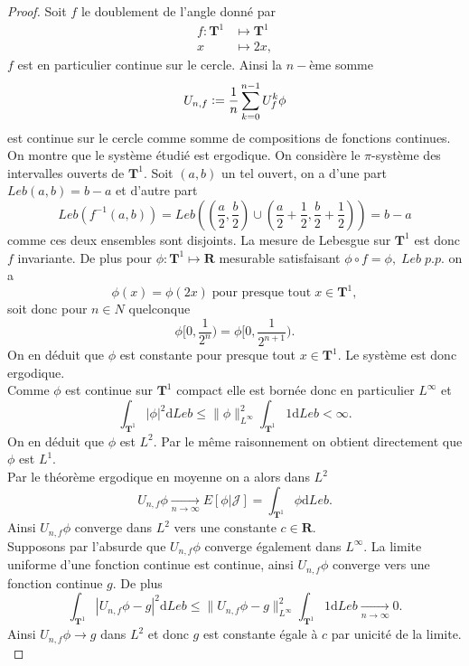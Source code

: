 \documentclass[12pt]{article}
\newcommand{\defeq}{\vcentcolon=}
\newcommand{\R}{\mathbf{R}}
\newcommand{\de}{\mathrm{d}}
\begin{document}
\begin{proof}
        Soit $f$ le doublement de l'angle donné par 
         \begin{align*}
                 f : \mathbf{T}^{1} &\longmapsto \mathbf{T}^{1} \\
                 x &\longmapsto 2x
        ,\end{align*} $f$ est en particulier continue sur le cercle. Ainsi la $n-$ème somme \[
        U_{n, f} \defeq \frac{1}{n}\sum_{k=0}^{n-1} U_{f}^{k}\phi 
        \] est continue sur le cercle comme somme de compositions de fonctions continues. \\  

        On montre que le système étudié est ergodique. On considère le $\pi$-système des intervalles ouverts de $\mathbf{T}^{1}$. Soit $(a, b)$ un tel ouvert, on a d'une part $Leb(a,b) = b-a$ et d'autre part \[
                Leb(f^{-1}(a,b)) = Leb((\frac{a}{2}, \frac{b}{2})\cup (\frac{a}{2}+\frac{1}{2}, \frac{b}{2}+\frac{1}{2})) = b-a
        \] comme ces deux ensembles sont disjoints. La mesure de Lebesgue sur $\mathbf{T}^{1}$ est donc $f$ invariante. De plus pour $\phi : \mathbf{T}^{1} \longmapsto \R$ mesurable satisfaisant $\phi\circ f = \phi, \; Leb \; p.p.$ on a \[
        \phi(x) = \phi(2x)\; \text{pour presque tout} \; x \in \mathbf{T}^{1},
\] soit donc pour $n \in N$ quelconque \[
\phi[0, \frac{1}{2^{n}}) = \phi[0, \frac{1}{2^{n+1}})
.\] On en déduit que $\phi$ est constante pour presque tout $x \in \mathbf{T}^{1}$. Le système est donc ergodique. \\

Comme $\phi$ est continue sur $\mathbf{T}^{1}$ compact elle est bornée donc en particulier $L^{\infty}$ et  \[
\int_{\mathbf{T}^{1}}|\phi|^{2}\de Leb \le \|\phi\|_{L^{\infty}}^{2}\int_{\mathbf{T}^{1}}1\de Leb < \infty
.\] On en déduit que $\phi$ est $L^{2}$. Par le même raisonnement on obtient directement que $\phi$ est $L^{1}$. \\

Par le théorème ergodique en moyenne on a alors dans $L^{2}$ \[
        U_{n,f}\phi \underset{n\to \infty}{\to} E[\phi|\mathcal{J}] = \int_{\mathbf{T}^{1}}\phi \de Leb
.\] Ainsi $U_{n,f}\phi$ converge dans $L^{2}$ vers une constante $c \in \R$. \\ 

Supposons par l'absurde que $U_{n,f}\phi$ converge également dans $L^{\infty}$. La limite uniforme d'une fonction continue est continue, ainsi $U_{n,f}\phi$ converge vers une fonction continue $g$. De plus  \[
\int_{\mathbf{T}^{1}}|U_{n,f}\phi - g|^{2} \de Leb \le \|U_{n,f}\phi - g\|_{L^{\infty}}^{2}\int_{\mathbf{T}^{1}}1\de Leb \underset{n \to \infty}{\to} 0
.\]  
Ainsi $U_{n,f}\phi \to g$ dans $L^{2}$ et donc $g$ est constante égale à $c$ par unicité de la limite. \\


\end{proof}
\end{document}

